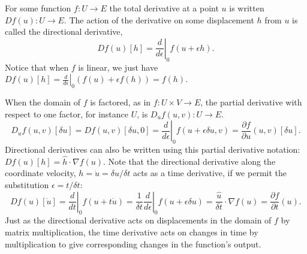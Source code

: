 \documentclass{article}
\newcommand{\ep}{\epsilon}
\newcommand{\p}{\partial}
\newcommand{\deriv}[2]{\frac{\p #1}{\p #2}}
\newcommand{\pth} [1] {\left( #1 \right) }
\begin{document}
For some function $f:U \rightarrow E$ the total derivative at a point $u$ is written $Df(u): U\rightarrow E$. The action of the derivative on some displacement $h$ from $u$ is called the directional derivative,  
\begin{equation} \label{frechet}
    Df(u)[h] = \left. \frac{d}{d\ep} \right|_0 f(u+\ep h). 
\end{equation}
Notice that when $f$ is linear, we just have $Df(u)[h] = \left. \frac{d}{d\ep} \right|_0 \pth{f(u)+\ep f(h)} = f(h)$. 

When the domain of $f$ is factored, as in $f: U\times V \rightarrow E$, the partial derivative with respect to  one factor, for instance $U$, is $D_uf(u, v): U \rightarrow E$.  
\begin{equation} \label{partial}
    D_uf(u, v)[\delta u] = Df(u, v) [\delta u, 0] = \left. \frac{d}{d\ep} \right|_0 f(u + \ep\delta u, v) = \deriv{f}{u}(u,v)[\delta u]. 
\end{equation}
Directional derivatives can also be written using this partial derivative notation: $Df(u)[h] = \hat{h}\cdot \nabla f(u)$. Note that the directional derivative along the coordinate velocity, $h=\dot{u}=\delta u/\delta t$ acts as a time derivative, if we permit the substitution $\ep = t/\delta t$: 
$$Df(u)[\dot{u}] = \left. \frac{d}{dt} \right|_0 f(u + t\dot{u}) = \frac{1}{\delta t} \left. \frac{d}{d\ep} \right|_0 f(u + \ep\delta u) = \frac{\hat{u}}{\delta t}\cdot \nabla f(u) = \deriv{f}{t}(u). $$
Just as the directional derivative acts on displacements in the domain of $f$ by matrix multiplication, the time derivative acts on changes in time by multiplication to give corresponding changes in the function's output. 
\end{document}
